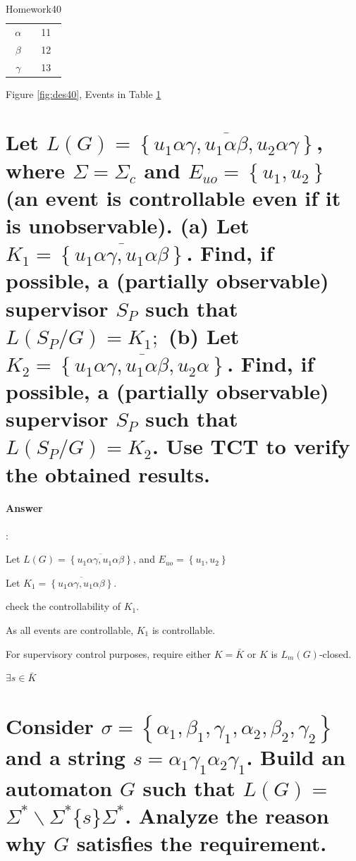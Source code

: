 \documentclass{article}
\begin{document}
\begin{table}
  \centering
  \begin{tabular}{|c|c|}
    $\alpha$ & 11\\
    $\beta$ & 12\\
    $\gamma$ & 13\\
  \end{tabular}
  \caption{Homework40}
  \label{tab:des40}
\end{table}

Figure \ref{fig:des40}, Events in Table \ref{tab:des40}

\section{Let $L(G)=\overline{\left\{u_1 \alpha \gamma, u_1 \alpha \beta, u_2 \alpha \gamma\right\}}$, where $\Sigma=\Sigma_c$ and $E_{u o}=\left\{u_1, u_2\right\}$ (an event is controllable even if it is unobservable). (a) Let $K_1=\overline{\left\{u_1 \alpha \gamma, u_1 \alpha \beta\right\}}$. Find, if possible, a (partially observable) supervisor $S_P$ such that $L\left(S_P / G\right)=K_1 ;$ (b) Let $K_2=\overline{\left\{u_1 \alpha \gamma, u_1 \alpha \beta, u_2 \alpha\right\}}$. Find, if possible, a (partially observable) supervisor $S_P$ such that $L\left(S_P / G\right)=K_2$. Use TCT to verify the obtained results.}

\paragraph{Answer}:

Let $L(G)=\overline{\left\{u_1 \alpha \gamma, u_1 \alpha \beta\right\}}$, and $E_{uo} = \left\{u_1, u_2\right\}$

Let $K_1=\overline{\left\{u_1 \alpha \gamma, u_1 \alpha \beta\right\}}$.

check the controllability of $K_1$.

As all events are controllable, $K_1$ is controllable.

For supervisory control purposes, require either $K = \bar{K}$ or $K$ is $L_m(G)$-closed.

$\exists s \in \bar{K}$




\section{Consider $\sigma=\left\{\alpha_1, \beta_1, \gamma_1, \alpha_2, \beta_2, \gamma_2\right\}$ and a string $s=\alpha_1 \gamma_1 \alpha_2 \gamma_1$. Build an automaton $G$ such that $L(G)=$ $\Sigma^* \backslash \Sigma^*\{s\} \Sigma^*$. Analyze the reason why $G$ satisfies the requirement.}
\end{document}
